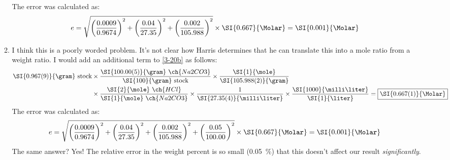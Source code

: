 \documentclass{article}
\begin{document}
\begin{enumerate}[start=18]
\begin{enumerate}
				The error was calculated as:
				\begin{align*}
					e &= \sqrt{\bigg(\frac{0.0009}{0.9674}\bigg)^2
						+ \bigg(\frac{0.04}{27.35}\bigg)^2
					+ \bigg(\frac{0.002}{105.988}\bigg)^2}
					\times \SI{0.667}{\Molar} = \SI{0.001}{\Molar}
				\end{align*}
			\item I think this is a poorly worded problem. It's not
				clear how Harris determines that he can
				translate this into a mole ratio from a weight
				ratio. I would add an additional term to
				\ref{3-20b} as follows:
				\begin{align*}
					\SI{0.967(9)}{\gram}~\text{stock} &\times
					\frac{\SI{100.00(5)}{\gram}~\ch{Na2CO3}}{\SI{100}{\gram}~\text{stock}}
					\times
					\frac{\SI{1}{\mole}}{\SI{105.988(2)}{\gram}}
					\\
					&\times
					\frac{\SI{2}{\mole}~\ch{HCl}}{\SI{1}{\mole}~\ch{Na2CO3}}
					\times
					\frac{1}{\SI{27.35(4)}{\milli\liter}}
					\times
					\frac{\SI{1000}{\milli\liter}}{\SI{1}{\liter}}
					= \boxed{\SI{0.667(1)}{\Molar}}
				\end{align*}
				The error was calculated as:
				\begin{align*}
					e &= \sqrt{\bigg(\frac{0.0009}{0.9674}\bigg)^2
						+ \bigg(\frac{0.04}{27.35}\bigg)^2
					+ \bigg(\frac{0.002}{105.988}\bigg)^2
					+ \bigg(\frac{0.05}{100.00}\bigg)^2}
					\times \SI{0.667}{\Molar} = \SI{0.001}{\Molar}
				\end{align*}
				The same answer? Yes! The relative error in the
				weight percent is so small (\SI{0.05}{\percent})
				that this doesn't affect our result
				\emph{significantly}.
		\end{enumerate}
\end{enumerate}
\end{document}
